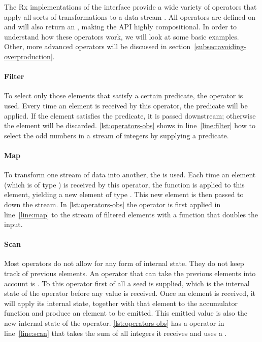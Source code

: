 The Rx implementations of the \obs interface provide a wide variety of operators that apply all sorts of transformations to a data stream \cite{rx-api}. All operators are defined on \obs and will also return an \obs, making the API highly compositional. In order to understand how these operators work, we will look at some basic examples. Other, more advanced operators will be discussed in section~\ref{subsec:avoiding-overproduction}.

\paragraph{Filter}To select only those elements that satisfy a certain predicate, the operator  is used. Every time an element is received by this operator, the predicate  will be applied. If the element satisfies the predicate, it is passed downstream; otherwise the element will be discarded. \autoref{lst:operators-obs} shows in line~\ref{line:filter} how to select the odd numbers in a stream of integers by supplying a predicate.

\paragraph{Map}To transform one stream of data into another, the  is used. Each time an element (which is of type ) is received by this operator, the function  is applied to this element, yielding a new element of type . This new element is then passed to down the stream. In \autoref{lst:operators-obs} the  operator is first applied in line~\ref{line:map} to the stream of filtered elements with a function that doubles the input.

\paragraph{Scan}Most operators do not allow for any form of internal state. They do not keep track of previous elements. An operator that can take the previous elements into account is . To this operator first of all a seed is supplied, which is the internal state of the operator before any value is received. Once an element is received, it will apply its internal state, together with that element to the accumulator function  and produce an element to be emitted. This emitted value is also the new internal state of the operator. \autoref{lst:operators-obs} has a  operator in line~\ref{line:scan} that takes the sum of all integers it receives and uses a .

